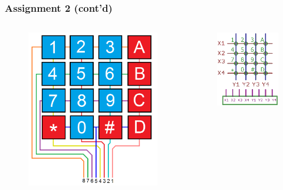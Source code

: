 \documentclass[aspectratio=169,usenames,dvipsnames]{beamer}
\newcounter{cont}
\begin{document}
\begin{frame}
  \frametitle{Assignment 2 (cont'd)}
  \begin{columns}
      \begin{figure}
        \centering
        \includegraphics[scale=0.2]{images/keypad-pinout1.png}
      \end{figure}
      \begin{figure}
        \centering
        \includegraphics[scale=0.4]{images/keypad-pinout2.png}
      \end{figure}
  \end{columns}
\end{frame}
\end{document}
